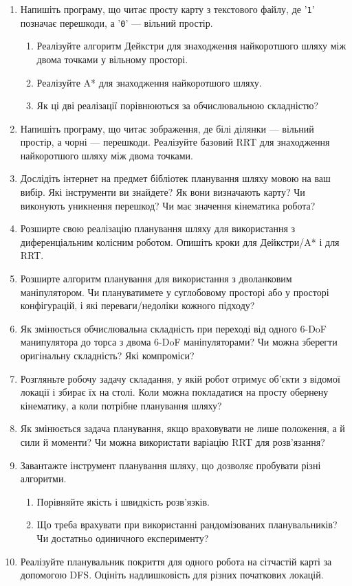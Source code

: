 \begin{enumerate}
\item Напишіть програму, що читає просту карту з текстового файлу, де '\texttt{1}' позначає перешкоди, а '\texttt{0}' — вільний простір.
\begin{enumerate}
\item Реалізуйте алгоритм Дейкстри для знаходження найкоротшого шляху між двома точками у вільному просторі.
\item Реалізуйте A* для знаходження найкоротшого шляху.
\item Як ці дві реалізації порівнюються за обчислювальною складністю?
\end{enumerate}
\item Напишіть програму, що читає зображення, де білі ділянки — вільний простір, а чорні — перешкоди. Реалізуйте базовий RRT для знаходження найкоротшого шляху між двома точками.
\item Дослідіть інтернет на предмет бібліотек планування шляху мовою на ваш вибір. Які інструменти ви знайдете? Як вони визначають карту? Чи виконують уникнення перешкод? Чи має значення кінематика робота?
\item Розширте свою реалізацію планування шляху для використання з диференціальним колісним роботом. Опишіть кроки для Дейкстри/A* і для RRT.
\item Розширте алгоритм планування для використання з дволанковим маніпулятором. Чи плануватимете у суглобовому просторі або у просторі конфігурацій, і які переваги/недоліки кожного підходу?
\item Як змінюється обчислювальна складність при переході від одного 6-DoF манипулятора до торса з двома 6-DoF маніпуляторами? Чи можна зберегти оригінальну складність? Які компроміси?
\item Розгляньте робочу задачу складання, у якій робот отримує об'єкти з відомої локації і збирає їх на столі. Коли можна покладатися на просту обернену кінематику, а коли потрібне планування шляху?
\item Як змінюється задача планування, якщо враховувати не лише положення, а й сили й моменти? Чи можна використати варіацію RRT для розв'язання?
\item Завантажте інструмент планування шляху, що дозволяє пробувати різні алгоритми.
\begin{enumerate}
\item Порівняйте якість і швидкість розв'язків.
\item Що треба врахувати при використанні рандомізованих планувальників? Чи достатньо одиничного експерименту?
\end{enumerate}
\item Реалізуйте планувальник покриття для одного робота на сітчастій карті за допомогою DFS. Оцініть надлишковість для різних початкових локацій.
\end{enumerate}

\normalsize
